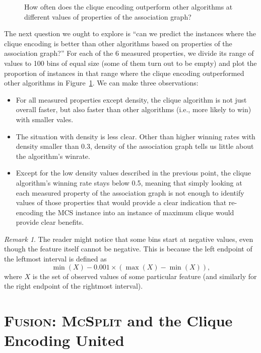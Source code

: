 \documentclass{l4proj}
\theoremstyle{definition}
\theoremstyle{remark}
\newtheorem{remark}{Remark}[chapter]
\begin{document}
\begin{figure}
\begin{subfigure}[t]{0.49\textwidth}
  \end{subfigure}
  \caption{How often does the clique encoding outperform other algorithms at
    different values of properties of the association graph?}
  \label{fig:bins}
\end{figure}

The next question we ought to explore is ``can we predict the instances where
the clique encoding is better than other algorithms based on properties of the
association graph?'' For each of the 6 measured properties, we divide its range
of values to 100 bins of equal size (some of them turn out to be empty) and plot
the proportion of instances in that range where the clique encoding outperformed
other algorithms in Figure~\ref{fig:bins}. We can make three observations:
\begin{itemize}
\item For all measured properties except density, the clique algorithm is not
  just overall faster, but also faster than other algorithms (i.e., more likely
  to win) with smaller vales.
\item The situation with density is less clear. Other than higher winning rates
  with density smaller than 0.3, density of the association graph tells us
  little about the algorithm's winrate.
\item Except for the low density values described in the previous point, the
  clique algorithm's winning rate stays below 0.5, meaning that simply looking
  at each measured property of the association graph is not enough to identify
  values of those properties that would provide a clear indication that
  re-encoding the MCS instance into an instance of maximum clique would provide
  clear benefits.
\end{itemize}

\begin{remark}
  The reader might notice that some bins start at negative values, even though
  the feature itself cannot be negative. This is because the left endpoint of
  the leftmost interval is defined as
  \[ \min(X) - 0.001 \times (\max(X) - \min(X)), \]
  where $X$ is the set of observed values of some particular feature \cite{R}
  (and similarly for the right endpoint of the rightmost interval).
\end{remark}

\section{\textsc{Fusion}: \textsc{McSplit} and the Clique Encoding United}
\end{document}
